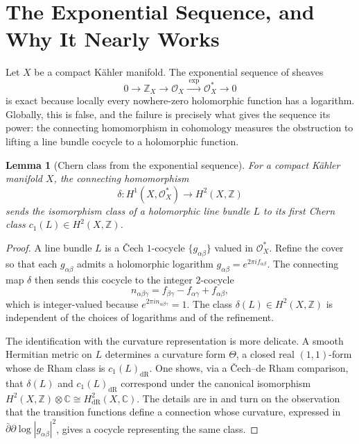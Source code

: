 \documentclass[12pt]{article}
\theoremstyle{plain}
\newtheorem{lemma}[theorem]{Lemma}
\theoremstyle{definition}
\begin{document}
\section{The Exponential Sequence, and Why It Nearly Works}

Let $X$ be a compact K\"ahler manifold. 
The exponential sequence of sheaves
\[
0 \longrightarrow \mathbb Z_X \longrightarrow \mathcal O_X \xrightarrow{\;\exp\;} \mathcal O_X^* \longrightarrow 0
\]
is exact because locally every nowhere-zero holomorphic function has a logarithm. 
Globally, this is false, and the failure is precisely what gives the sequence its power: the connecting homomorphism in cohomology measures the obstruction to lifting a line bundle cocycle to a holomorphic function.

\begin{lemma}[Chern class from the exponential sequence]\label{lem:exp-c1}
For a compact K\"ahler manifold $X$, the connecting homomorphism
\[
\delta: H^1(X,\mathcal O_X^*) \longrightarrow H^2(X,\mathbb Z)
\]
sends the isomorphism class of a holomorphic line bundle $L$ to its first Chern class $c_1(L) \in H^2(X,\mathbb Z)$.
\end{lemma}

\begin{proof}
A line bundle $L$ is a Čech $1$-cocycle $\{g_{\alpha\beta}\}$ valued in $\mathcal O_X^*$. 
Refine the cover so that each $g_{\alpha\beta}$ admits a holomorphic logarithm $g_{\alpha\beta} = e^{2\pi i f_{\alpha\beta}}$. 
The connecting map $\delta$ then sends this cocycle to the integer $2$-cocycle
\[
n_{\alpha\beta\gamma} = f_{\beta\gamma} - f_{\alpha\gamma} + f_{\alpha\beta},
\]
which is integer-valued because $e^{2\pi i n_{\alpha\beta\gamma}} = 1$. 
The class $\delta(L) \in H^2(X,\mathbb Z)$ is independent of the choices of logarithms and of the refinement.

The identification with the curvature representation is more delicate. 
A smooth Hermitian metric on $L$ determines a curvature form $\Theta$, a closed real $(1,1)$-form whose de Rham class is $c_1(L)_{\mathrm{dR}}$. 
One shows, via a Čech--de Rham comparison, that $\delta(L)$ and $c_1(L)_{\mathrm{dR}}$ correspond under the canonical isomorphism $H^2(X,\mathbb Z) \otimes \mathbb C \cong H^2_{\mathrm{dR}}(X,\mathbb C)$. 
The details are in \cite{griffiths-harris} and turn on the observation that the transition functions define a connection whose curvature, expressed in $\bar\partial\partial\log|g_{\alpha\beta}|^2$, gives a cocycle representing the same class.
\end{proof}
\end{document}
